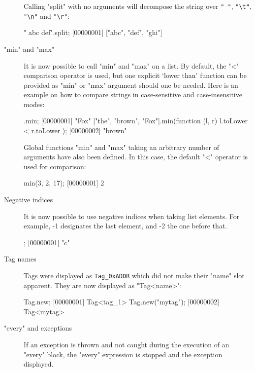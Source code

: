 \begin{description}
Calling "split" with no arguments will decompose the string over
\lstinline|" "|, \lstinline|"\t"|, \lstinline|"\n"| and
\lstinline|"\r"|:

\begin{urbiscript}
"  abc  def\tghi\n".split;
[00000001] ["abc", "def", "ghi"]
\end{urbiscript}


\item["min" and "max"]

It is now possible to call "min" and "max" on a list. By default, the
"<" comparison operator is used, but one explicit `lower than'
function can be provided as "min" or "max" argument should one be
needed. Here is an example on how to compare strings in case-sensitive
and case-insensitive modes:

\begin{urbiscript}
.min;
[00000001] "Fox"
["the", "brown", "Fox"].min(function (l, r) { l.toLower < r.toLower });
[00000002] "brown"
\end{urbiscript}

Global functions "min" and "max" taking an arbitrary number of
arguments have also been defined. In this case, the default "<"
operator is used for comparison:

\begin{urbiscript}
min(3, 2, 17);
[00000001] 2
\end{urbiscript}

\item[Negative indices]

It is now possible to use negative indices when taking list elements.
For example, -1 designates the last element, and -2 the one before that.

\begin{urbiscript}
["a", "b", "c"][-1];
[00000001] "c"
\end{urbiscript}

\item[Tag names]

  Tags were displayed as \lstinline|Tag_0xADDR| which did not make
  their "name" slot apparent. They are now displayed as "Tag<name>":

\begin{urbiscript}
Tag.new;
[00000001] Tag<tag_1>
Tag.new("mytag");
[00000002] Tag<mytag>
\end{urbiscript}

\item["every" and exceptions]

If an exception is thrown and not caught during the execution of an "every"
block, the "every" expression is stopped and the exception displayed.
\end{description}

